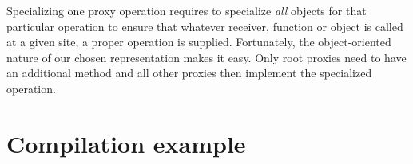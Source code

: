 
Specializing one proxy operation requires to specialize \textit{all} objects
for that particular operation to ensure that whatever receiver, function or
object is called at a given site, a proper operation is supplied. Fortunately,
the object-oriented nature of our chosen representation makes it easy. Only
root proxies need to have an additional method and all other proxies  then
implement the specialized operation.

%
%
%

%

\section{Compilation example}

